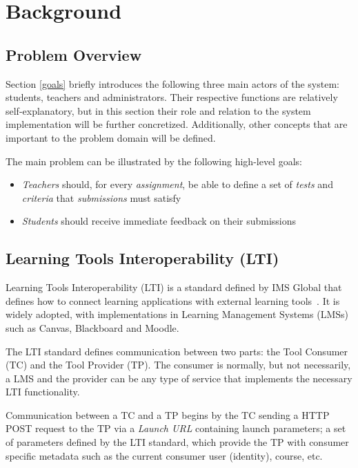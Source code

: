 \chapter{Background}

\section{Problem Overview}
\label{problem} %
Section \ref{goals} briefly introduces the following three main actors of the system: students, teachers and administrators. Their respective functions are relatively self-explanatory, but in this section their role and relation to the system implementation will be further concretized. Additionally, other concepts that are important to the problem domain will be defined.

The main problem can be illustrated by the following high-level goals:

\begin{itemize}
    \item \textit{Teachers} should, for every \emph{assignment}, be able to define a set of \textit{tests} and \textit{criteria} that \textit{submissions} must satisfy
    \item \textit{Students} should receive immediate feedback on their submissions
\end{itemize}



\section{Learning Tools Interoperability (LTI)}
Learning Tools Interoperability (LTI) is a standard defined by IMS Global that defines how to connect learning applications with external learning tools~\citep{OleksandrA.2015LearningPlatforms}. It is widely adopted, with implementations in Learning Management Systems (LMSs) such as Canvas, Blackboard and Moodle. %

The LTI standard defines communication between two parts: the Tool Consumer (TC) and the Tool Provider (TP). The consumer is normally, but not necessarily, a LMS and the provider can be any type of service that implements the necessary LTI functionality.

Communication between a TC and a TP begins by the TC sending a HTTP POST request to the TP via a \textit{Launch URL} containing launch parameters; a set of parameters defined by the LTI standard, which provide the TP with consumer specific metadata such as the current consumer user (identity), course, etc.

